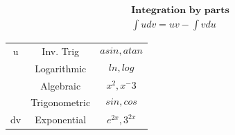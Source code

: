 \documentclass[fleqn]{article}
\begin{document}
     \begin{table}[h]
         \begin{align*}
        \textbf{Integration by parts}\\
        \int udv = uv- \int vdu    
        \end{align*}


        
        \begin{tabular}{c|c|c}
             u& Inv. Trig&\[asin,atan\]\\
             &  Logarithmic & \[ln,log\]\\
             &  Algebraic & \[x^2,x^-3\]\\
             &  Trigonometric& \[sin,cos\] \\
             dv& Exponential& \[e^{2x},3^{2x}\]\\
        \end{tabular}
    \end{table}
\end{document}

